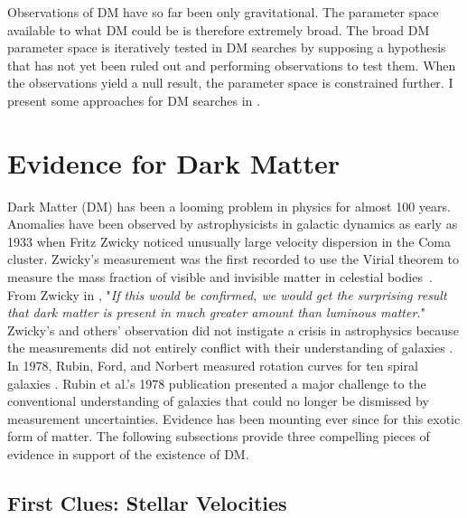 Observations of DM have so far been only gravitational.
The parameter space available to what DM could be is therefore extremely broad.
The broad DM parameter space is iteratively tested in DM searches by supposing a hypothesis that has not yet been ruled out and performing observations to test them.
When the observations yield a null result, the parameter space is constrained further.
I present some approaches for DM searches in .

\section{Evidence for Dark Matter}\label{sec:evidence4dm}

Dark Matter (DM) has been a looming problem in physics for almost 100 years.
Anomalies have been observed by astrophysicists in galactic dynamics as early as 1933 when Fritz Zwicky noticed unusually large velocity dispersion in the Coma cluster.
Zwicky's measurement was the first recorded to use the Virial theorem to measure the mass fraction of visible and invisible matter in celestial bodies~\cite{Hooper:DMHistory}.
From Zwicky in \cite{Zwicky:1933}, "\textit{If this would be confirmed, we would get the surprising result that dark matter is present in much greater amount than luminous matter.}"
Zwicky's and others' observation did not instigate a crisis in astrophysics because the measurements did not entirely conflict with their understanding of galaxies \cite{Hooper:DMHistory}.
In 1978, Rubin, Ford, and Norbert measured rotation curves for ten spiral galaxies \cite{Rubin:1978}.
Rubin et al.'s 1978 publication presented a major challenge to the conventional understanding of galaxies that could no longer be dismissed by measurement uncertainties.
Evidence has been mounting ever since for this exotic form of matter.
The following subsections provide three compelling pieces of evidence in support of the existence of DM.

\subsection{First Clues: Stellar Velocities\label{sec:ev4dm_stars}}

